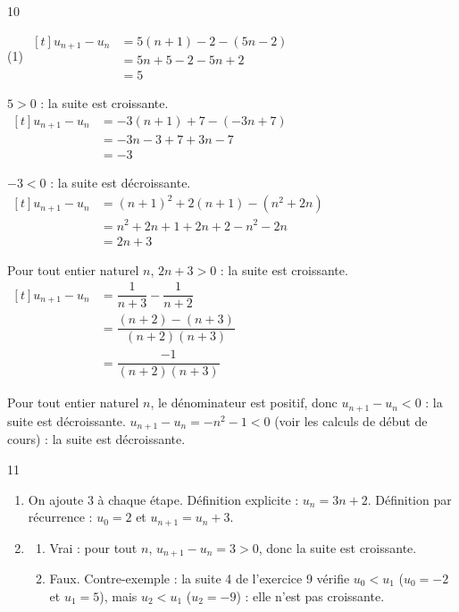\documentclass[10pt,a4paper]{article}
\begin{document}
\begin{corr}{10}
\begin{tasks}[after-item-skip=0.2cm](1)
    \task \(\begin{aligned}[t] u_{n+1}-u_n&=5(n+1)-2-(5n-2)\\ &=5n+5-2-5n+2\\ &=5\end{aligned}\)

    \(5>0\) : la suite est croissante.
    \task \(\begin{aligned}[t] u_{n+1}-u_n&=-3(n+1)+7-(-3n+7)\\ &=-3n-3+7+3n-7\\ &=-3\end{aligned}\)

    \(-3<0\) : la suite est décroissante.
    \task \(\begin{aligned}[t] u_{n+1}-u_n&=(n+1)^2+2(n+1)-(n^2+2n)\\ &=n^2+2n+1+2n+2-n^2-2n\\ &=2n+3\end{aligned}\)

    Pour tout entier naturel \(n\), \(2n+3>0\) : la suite est croissante.
    \task \(\begin{aligned}[t] u_{n+1}-u_n&=\dfrac{1}{n+3}-\dfrac{1}{n+2}\\ &=\dfrac{(n+2)-(n+3)}{(n+2)(n+3)}\\ &=\dfrac{-1}{(n+2)(n+3)}\end{aligned}\)

    Pour tout entier naturel \(n\), le dénominateur est positif, donc \(u_{n+1}-u_n<0\) : la suite est décroissante.
    \task \(u_{n+1}-u_n=-n^2-1<0\) (voir les calculs de début de cours) : la suite est décroissante.
\end{tasks}
\end{corr}

\begin{corr}{11}
\begin{enumerate}[leftmargin=*]
    \item On ajoute \(3\) à chaque étape. Définition explicite : \(u_n=3n+2\). Définition par récurrence : \(u_0=2\) et \(u_{n+1}=u_n+3\).
    \item \begin{enumerate}
        \item Vrai : pour tout \(n\), \(u_{n+1}-u_n=3>0\), donc la suite est croissante.
        \item Faux. Contre-exemple : la suite 4 de l'exercice 9 vérifie \(u_0<u_1\) (\(u_0=-2\) et \(u_1=5\)), mais \(u_2<u_1\) (\(u_2=-9\)) : elle n'est pas croissante.
    \end{enumerate}
\end{enumerate}
\end{corr}
\end{document}
